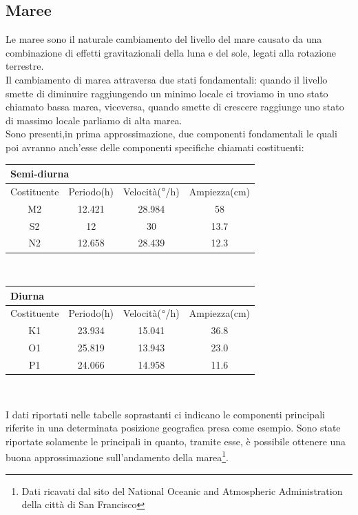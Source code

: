 \subsection{Maree}
Le maree sono il naturale cambiamento del livello del mare causato da una combinazione di effetti gravitazionali della luna e del sole, legati alla rotazione terrestre.\\Il cambiamento di marea attraversa due stati fondamentali: quando il livello smette di diminuire raggiungendo un minimo locale ci troviamo in uno stato chiamato bassa marea, viceversa, quando smette di crescere raggiunge uno stato di massimo locale parliamo di alta marea.\\
Sono presenti,in prima approssimazione, due componenti fondamentali le quali poi avranno anch'esse delle componenti specifiche chiamati costituenti:\\

\vspace{0,5em}\noindent
\begin{center}
    

\begin{tabular}{|c|c|c|c|}
\hline
\multicolumn{4}{|l|}{Semi-diurna}\\
\hline
Costituente & Periodo(h) & Velocità($\degree$/h) & Ampiezza(cm) \\ 
\hline
M2  & 12.421 & 28.984 & 58  \\ \hline
S2  & 12 & 30 & 13.7  \\ \hline
N2  & 12.658 & 28.439 & 12.3  \\\hline
\end{tabular}\\

\vspace{1em}\noindent
\begin{tabular}{|c|c|c|c|}
\hline
\multicolumn{4}{|l|}{Diurna}\\
\hline
Costituente & Periodo(h) & Velocità($\degree$/h) & Ampiezza(cm) \\ 
\hline
K1  & 23.934 & 15.041 & 36.8 \\ \hline
O1  & 25.819 & 13.943 & 23.0 \\ \hline
P1 & 24.066 & 14.958 & 11.6 \\\hline
\end{tabular}\\
\end{center}
\vspace{1em}
\noindent
I dati riportati nelle tabelle soprastanti ci indicano le componenti principali riferite in una determinata posizione geografica presa come esempio. Sono state riportate solamente le principali in quanto, tramite esse, è possibile ottenere una buona approssimazione sull'andamento della marea\footnote{Dati ricavati dal sito del National Oceanic and Atmospheric Administration della città di San Francisco}.

